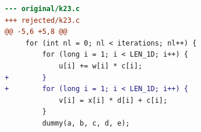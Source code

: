 \begin{lstlisting}[language=diff,basicstyle=\ttfamily\scriptsize,breaklines=true,caption={tsvc_c2/k23 — attempt 2 of 3, rejected by the gate at 'correctness': Program output changed — the patched program is NOT semantically equivalent to the original. / output differs and no numerical slack is in effect}]
--- original/k23.c
+++ rejected/k23.c
@@ -5,6 +5,8 @@
     for (int nl = 0; nl < iterations; nl++) {
         for (long i = 1; i < LEN_1D; i++) {
             u[i] += w[i] * c[i];
+        }
+        for (long i = 1; i < LEN_1D; i++) {
             v[i] = x[i] * d[i] + c[i];
         }
         dummy(a, b, c, d, e);
\end{lstlisting}
